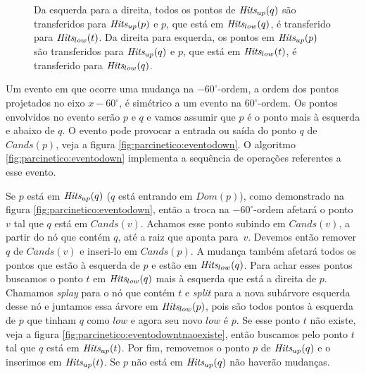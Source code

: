 \begin{figure}[h]
    \caption{Da esquerda para a direita,
    todos os pontos de $\textit{Hits}_{up}(q)$
    são transferidos para $\textit{Hits}_{up}(p)$
    e $p$, que está em $\textit{Hits}_{low}(q)$,
    é transferido para $\textit{Hits}_{low}(t)$.
    Da direita para esquerda, os pontos
    em $\textit{Hits}_{up}(p)$ são transferidos
    para $\textit{Hits}_{up}(q)$ e $p$, que está
    em $\textit{Hits}_{low}(t)$, é transferido
    para $\textit{Hits}_{low}(q)$.}
    \label{fig:parcinetico:eventouptnaoexiste}
\end{figure}
Um evento em que ocorre uma mudança na $-60^\circ$-ordem, a ordem
dos pontos projetados no eixo $x - 60^\circ$, é simétrico a um
evento na $60^\circ$-ordem. Os pontos envolvidos no evento serão $p$
e $q$ e vamos assumir que $p$ é o ponto mais à esquerda e abaixo de
$q$. O evento pode provocar a entrada ou saída do ponto $q$ de
$Cands(p)$, veja a figura \ref{fig:parcinetico:eventodown}. O
algoritmo \ref{fig:parcinetico:eventodown} implementa a sequência de
operações referentes a esse evento.

Se $p$ está em $\textit{Hits}_{up}(q)$ ($q$ está entrando em $Dom(p)$), como
demonstrado na figura \ref{fig:parcinetico:eventodown}, então a
troca na $-60^\circ$-ordem afetará o ponto $v$ tal que $q$ está em
$Cands(v)$. Achamos esse ponto subindo em $Cands(v)$, a partir do nó
que contém $q$, até a raiz que aponta para~$v$. Devemos então
remover $q$ de $Cands(v)$ e inseri-lo em $Cands(p)$. A mudança
também afetará todos os pontos que estão à esquerda de $p$ e estão
em $\textit{Hits}_{low}(q)$. Para achar esses pontos buscamos o ponto $t$ em
$\textit{Hits}_{low}(q)$ mais à esquerda que está a direita de $p$. Chamamos
\textit{splay} para o nó que contém $t$ e \textit{split} para a nova
subárvore esquerda desse nó e juntamos essa árvore em
$\textit{Hits}_{low}(p)$, pois são todos pontos à esquerda de $p$ que tinham
$q$ como $low$ e agora seu novo $low$ é $p$. Se esse ponto $t$ não
existe, veja a figura \ref{fig:parcinetico:eventodowntnaoexiste},
então buscamos pelo ponto $t$ tal que $q$ está em $\textit{Hits}_{up}(t)$.
Por fim, removemos o ponto $p$ de $\textit{Hits}_{up}(q)$ e o inserimos em
$\textit{Hits}_{up}(t)$. Se $p$ não está em $\textit{Hits}_{up}(q)$ não haverão
mudanças.

